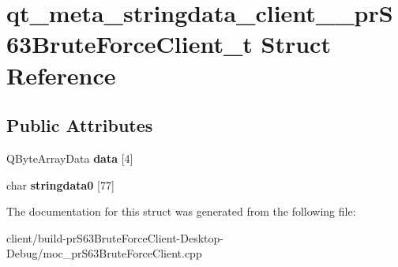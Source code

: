 \hypertarget{structqt__meta__stringdata__client____pr_s63_brute_force_client__t}{}\section{qt\+\_\+meta\+\_\+stringdata\+\_\+client\+\_\+\+\_\+pr\+S63\+Brute\+Force\+Client\+\_\+t Struct Reference}
\label{structqt__meta__stringdata__client____pr_s63_brute_force_client__t}
\subsection*{Public Attributes}
\begin{DoxyCompactItemize}
\item 
\mbox{\label{structqt__meta__stringdata__client____pr_s63_brute_force_client__t_a5074a7662d1c6fd4fc858026f5cd76cf}} 
Q\+Byte\+Array\+Data {\bfseries data} \mbox{[}4\mbox{]}
\item 
\mbox{\label{structqt__meta__stringdata__client____pr_s63_brute_force_client__t_a98cb5162430a7c167b5f05d85e51ad61}} 
char {\bfseries stringdata0} \mbox{[}77\mbox{]}
\end{DoxyCompactItemize}


The documentation for this struct was generated from the following file\+:\begin{DoxyCompactItemize}
\item 
client/build-\/pr\+S63\+Brute\+Force\+Client-\/\+Desktop-\/\+Debug/moc\+\_\+pr\+S63\+Brute\+Force\+Client.\+cpp\end{DoxyCompactItemize}
